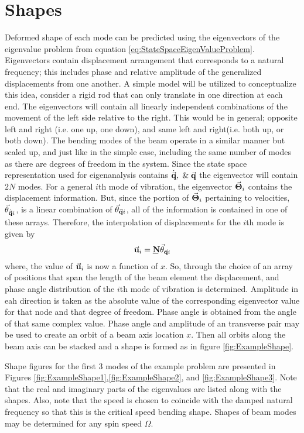 \section{Shapes}\label{Shapes}
Deformed shape of each mode can be predicted using the eigenvectors of the eigenvalue problem from equation \ref{eq:StateSpaceEigenValueProblem}. Eigenvectors contain displacement arrangement that corresponds to a natural frequency; this includes phase and relative amplitude of the generalized displacements from one another. A simple model will be utilized to conceptualize this idea, consider a rigid rod that can only translate in one direction at each end. The eigenvectors will contain all linearly independent combinations of the movement of the left side relative to the right. This would be in general; opposite left and right (i.e. one up, one down), and same left and right(i.e. both up, or both down). The bending modes of the beam operate in a similar manner but scaled up, and just like in the simple case, including the same number of modes as there are degrees of freedom in the system. Since the state space representation used for eigenanalysis contains $ \dot{\vec{\mathbf{q}}},\; \& \;\vec{\mathbf{q}} $ the eigenvector will contain $ 2N $ modes. For a general $ i $th mode of vibration, the eigenvector $ \vec{\mathbf{\Theta}}_i $ contains the displacement information. But, since the portion of $ \vec{\mathbf{\Theta}}_i $ pertaining to velocities, $ \vec{\mathbf{\theta}}_{\dot{\vec{\mathbf{q}}}i} $, is a linear combination of $ \vec{\mathbf{\theta}}_{\vec{\mathbf{q}}i} $, all of the information is contained in one of these arrays. Therefore, the interpolation of displacements for the $ i $th mode is given by
	\begin{equation}
	\vect{u}_i=\mat{N}\vect{\theta}_{\vect{q}i}
	\end{equation}
where, the value of $ \vec{\mathbf{u}}_i $ is now a function of $ x $. So, through the choice of an array of positions that span the length of the beam element the displacement, and phase angle distribution of the $ i $th mode of vibration is determined. Amplitude in eah direction is taken as the absolute value of the corresponding eigenvector value for that node and that degree of freedom. Phase angle is obtained from the angle of that same complex value. Phase angle and amplitude of an transverse pair may be used to create an orbit of a beam axis location $ x $. Then all orbits along the beam axis can be stacked and a shape is formed as in figure \ref{fig:ExampleShape}.\par
Shape figures for the first 3 modes of the example problem are presented in Figures \ref{fig:ExampleShape1},\ref{fig:ExampleShape2}, and \ref{fig:ExampleShape3}. Note that the real and imaginary parts of the eigenvalues are listed along with the shapes. Also, note that the speed is chosen to coincide with the damped natural frequency so that this is the critical speed bending shape. Shapes of beam modes may be determined for any spin speed $ \Omega $.\par
